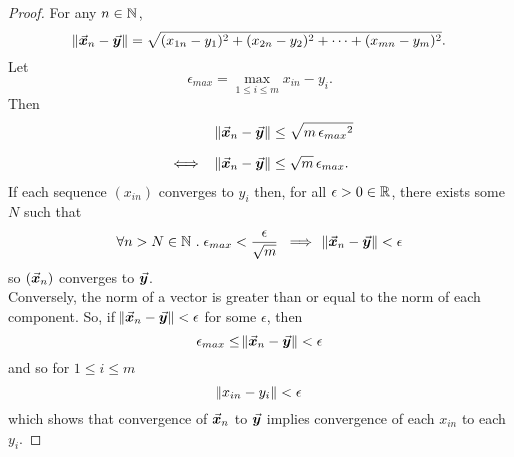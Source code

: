 \documentclass[../MathsNotesBase.tex]{subfiles}
\begin{document}
{		
	
		\biggerskip
		\begin{proof}
			For any ${ n \in \mathbb{N}^{} }$,
			\[ \norm{\vec{\bm{x}}_n - \vec{\bm{y}}} = \sqrt{ (x_{1n} - y_1)^2 + (x_{2n} - y_2)^2 + \cdots + (x_{mn} - y_m)^2 }. \]
			Let
			\[ \epsilon_{max} = \max_{1 \leq i \leq m} x_{in} - y_i. \]
			Then
			\[\begin{aligned}
				&& \norm{\x_n - \y} &\leq \sqrt{m\, {\epsilon_{max}}^2} \nn
				&\iff & \norm{\x_n - \y} &\leq \sqrt{m}\, \epsilon_{max}.
			\end{aligned}\]
			If each sequence $(x_{in})$ converges to $y_i$ then, for all ${ \epsilon > 0 \in \mathbb{R}^{} }$, there exists some $N$ such that
			\[ \forall n > N \in \mathbb{N}^{} \;.\; \epsilon_{max} < \frac{\epsilon}{\sqrt{m}} \; \implies \; \norm{\vec{\bm{x}}_n - \vec{\bm{y}}} < \epsilon \]
			so $(\vec{\bm{x}}_n)$ converges to $\vec{\bm{y}}$.\\
			
			Conversely, the norm of a vector is greater than or equal to the norm of each component. So, if ${ \norm{\vec{\bm{x}}_n - \vec{\bm{y}}} < \epsilon }$ for some ${ \epsilon }$, then
			\[ \epsilon_{max} \leq \norm{\vec{\bm{x}}_n - \vec{\bm{y}}} < \epsilon \]
			and so for ${ 1 \leq i \leq m }$
			\[ \norm{x_{in} - y_i} < \epsilon \]
			which shows that convergence of $\vec{\bm{x}}_n$ to $\vec{\bm{y}}$ implies convergence of each $x_{in}$ to each $y_i$.
		\end{proof}
	
	}


\pagebreak
\end{document}
